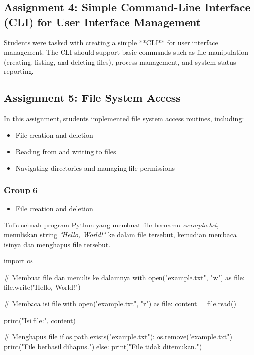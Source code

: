 \documentclass[12pt]{article}
\begin{document}
\subsection{Assignment 4: Simple Command-Line Interface (CLI) for User Interface Management}
Students were tasked with creating a simple **CLI** for user interface management. The CLI should support basic commands such as file manipulation (creating, listing, and deleting files), process management, and system status reporting.

\subsection{Assignment 5: File System Access}
In this assignment, students implemented file system access routines, including:
\begin{itemize}
    \item File creation and deletion
    \item Reading from and writing to files
    \item Navigating directories and managing file permissions
\end{itemize}

\subsubsection{Group 6}

\begin{itemize}
    \item File creation and deletion
\end{itemize}


Tulis sebuah program Python yang membuat file bernama \textit{example.txt}, menuliskan string \textit{"Hello, World!"} ke dalam file tersebut, kemudian membaca isinya dan menghapus file tersebut.

\begin{python}
    import os

    # Membuat file dan menulis ke dalamnya
    with open("example.txt", "w") as file:
        file.write("Hello, World!")

    # Membaca isi file
    with open("example.txt", "r") as file:
        content = file.read()

        print("Isi file:", content)

    # Menghapus file
    if os.path.exists("example.txt"):
        os.remove("example.txt")
        print("File berhasil dihapus.")
    else:
        print("File tidak ditemukan.")
\end{python}
\end{document}
